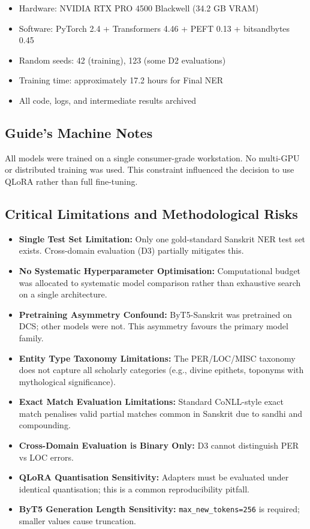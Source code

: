 \begin{itemize}
    \item Hardware: NVIDIA RTX PRO 4500 Blackwell (34.2 GB VRAM)
    \item Software: PyTorch 2.4 \cite{paszke2019pytorch} + Transformers 4.46 \cite{wolf2020transformers} + PEFT 0.13 \cite{peft2022} + bitsandbytes 0.45 \cite{dettmers2022bitsandbytes}
    \item Random seeds: 42 (training), 123 (some D2 evaluations)
    \item Training time: approximately 17.2 hours for Final NER
    \item All code, logs, and intermediate results archived
\end{itemize}

\subsection{Guide’s Machine Notes}
\label{subsec:machine_notes}

All models were trained on a single consumer-grade workstation. No multi-GPU or distributed training was used. This constraint influenced the decision to use QLoRA \cite{dettmers2023qlora} rather than full fine-tuning.

\subsection{Critical Limitations and Methodological Risks}
\label{subsec:limitations}

\begin{itemize}
    \item \textbf{Single Test Set Limitation:} Only one gold-standard Sanskrit NER test set exists. Cross-domain evaluation (D3) partially mitigates this.
    \item \textbf{No Systematic Hyperparameter Optimisation:} Computational budget was allocated to systematic model comparison rather than exhaustive search on a single architecture.
    \item \textbf{Pretraining Asymmetry Confound:} ByT5-Sanskrit was pretrained on DCS; other models were not. This asymmetry favours the primary model family.
    \item \textbf{Entity Type Taxonomy Limitations:} The PER/LOC/MISC taxonomy does not capture all scholarly categories (e.g., divine epithets, toponyms with mythological significance).
    \item \textbf{Exact Match Evaluation Limitations:} Standard CoNLL-style \cite{tjong2003conll} exact match penalises valid partial matches common in Sanskrit due to sandhi and compounding.
    \item \textbf{Cross-Domain Evaluation is Binary Only:} D3 cannot distinguish PER vs LOC errors.
    \item \textbf{QLoRA Quantisation Sensitivity:} Adapters must be evaluated under identical quantisation; this is a common reproducibility pitfall.
    \item \textbf{ByT5 Generation Length Sensitivity:} \texttt{max\_new\_tokens=256} is required; smaller values cause truncation.
\end{itemize}

